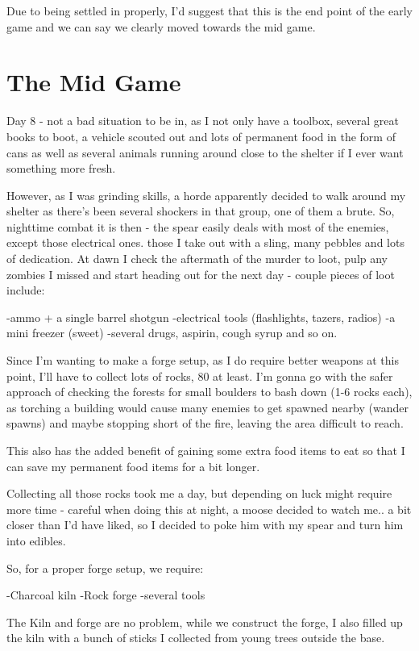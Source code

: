 Due to being settled in properly, I'd suggest that this is the end point of the early game and we can say we clearly moved towards the mid game.

\section{The Mid Game}

Day 8 - not a bad situation to be in, as I not only have a toolbox, several great books to boot, a vehicle scouted out and lots of permanent food in the form of cans as well as several animals running around close to the shelter if I ever want something more fresh.

However, as I was grinding skills, a horde apparently decided to walk around my shelter as there's been several shockers in that group, one of them a brute. So, nighttime combat it is then - the spear easily deals with most of the enemies, except those electrical ones. those I take out with a sling, many pebbles and lots of dedication. At dawn I check the aftermath of the murder to loot, pulp any zombies I missed and start heading out for the next day - couple pieces of loot include:

-ammo + a single barrel shotgun
-electrical tools (flashlights, tazers, radios)
-a mini freezer (sweet)
-several drugs, aspirin, cough syrup and so on.

Since I'm wanting to make a forge setup, as I do require better weapons at this point, I'll have to collect lots of rocks, 80 at least. I'm gonna go with the safer approach of checking the forests for small boulders to bash down (1-6 rocks each), as torching a building would cause many enemies to get spawned nearby (wander spawns) and maybe stopping short of the fire, leaving the area difficult to reach.

This also has the added benefit of gaining some extra food items to eat so that I can save my permanent food items for a bit longer.

Collecting all those rocks took me a day, but depending on luck might require more time - careful when doing this at night, a moose decided to watch me.. a bit closer than I'd have liked, so I decided to poke him with my spear and turn him into edibles.

So, for a proper forge setup, we require:

-Charcoal kiln
-Rock forge
-several tools

The Kiln and forge are no problem, while we construct the forge, I also filled up the kiln with a bunch of sticks I collected from young trees outside the base.

